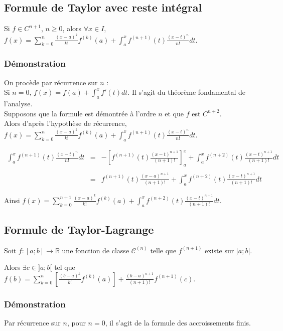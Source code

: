 \documentclass[a4paper,10pt]{book} %
\newcommand{\R}{\mathbb{R}}
\begin{document}
\subsection{Formule de Taylor avec reste intégral}
Si $f\in C^{n+1}$, $n\geq 0$, alors $\forall x\in I$,
$\displaystyle f(x)=\sum\limits_{k=0}^{n}\frac{(x-a)^k}{k!}f^{(k)}(a)+\int_{a}^{x}f^{(n+1)}(t)\frac{(x-t)^n}{n!}dt$.

\subsubsection{Démonstration}
On procède par récurrence sur $n$ :\\

Si $n=0$, $\displaystyle f(x)=f(a)+\int_{a}^{x}f'(t)dt$. Il s'agit du théorème fondamental de l'analyse.\\

Supposons que la formule est démontrée à l'ordre $n$ et que $f$ est $C^{n+2}$.\\
Alors d'après l'hypothèse de récurrence, $\displaystyle f(x)= \sum\limits_{k=0}^{n}\frac{(x-a)^k}{k!}f^{(k)}(a) +\int_{a}^{x}f^{(n+1)}(t)\frac{(x-t)^n}{n!}dt$.

$$\begin{array}{rcl}\displaystyle \int_{a}^{x}f^{(n+1)}(t)\frac{(x-t)^n}{n!}dt&=& \displaystyle-\left[f^{(n+1)}(t)\frac{(x-t)^{n+1}}{(n+1)!}\right]_a^x +\int_{a}^{x}f^{(n+2)}(t)\frac{(x-t)^{n+1}}{(n+1)!}dt\\\\
&=&\displaystyle f^{(n+1)}(t)\frac{(x-a)^{n+1}}{(n+1)!}+\int_{a}^{x}f^{(n+2)}(t)\frac{(x-t)^{n+1}}{(n+1)!}dt\end{array}$$

Ainsi $\displaystyle f(x)=\sum_{k=0}^{n+1}\frac{(x-a)^k}{k!}f^{(k)}(a)+\int_{a}^{x}f^{(n+2)}(t)\frac{(x-t)^{n+1}}{(n+1)!}dt$.

\subsection{Formule de Taylor-Lagrange}
Soit $f : [a;b] \rightarrow \R$ une fonction de classe $\mathcal{C}^{(n)}$ telle que $f^{(n+1)}$ existe sur $]a;b[$.\smallskip

Alors $\exists c\in ]a;b[$ tel que $\displaystyle f(b)=\sum\limits_{k=0}^n \left[\frac{(b-a)^k}{k!}f^{(k)}(a)\right]+\frac{(b-a)^{n+1}}{(n+1)!}f^{(n+1)}(c)$.

\subsubsection{Démonstration}
Par récurrence sur $n$, pour $n=0$, il s'agit de la formule des accroissements finis.\\
\end{document}
